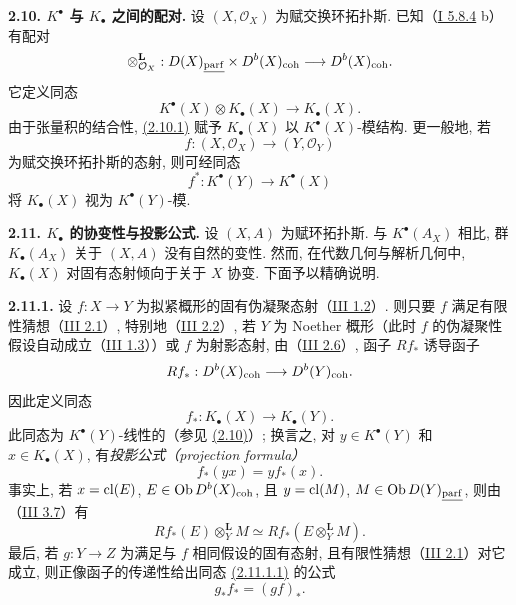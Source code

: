 \textbf{2.10. \(K^{\bullet}\) 与 \(K_{\bullet}\) 之间的配对.} 设 \((X,\mathcal O_X)\) 为赋交换环拓扑斯. 已知（\hyperlink{sga6.e01.rem.5-8-4}{I 5.8.4} b）有配对
\[
 \otimes_{\mathcal O_X}^{\mathbf L}:D(X)_{\underline{\operatorname{parf}}}\times D^b(X)_{\operatorname{coh}}
 \longrightarrow D^b(X)_{\operatorname{coh}}.
\]
它定义同态
\begin{equation}\tag{2.10.1}
 K^{\bullet}(X)\otimes K_{\bullet}(X)\longrightarrow K_{\bullet}(X).
\end{equation}
由于张量积的结合性, \hyperlink{sga6.e04.eq.2-10-1}{(2.10.1)} 赋予 \(K_{\bullet}(X)\) 以 \(K^{\bullet}(X)\)-模结构. 更一般地, 若
\[
 f:(X,\mathcal O_X)\longrightarrow (Y,\mathcal O_Y)
\]
为赋交换环拓扑斯的态射, 则可经同态
\[
 f^*:K^{\bullet}(Y)\longrightarrow K^{\bullet}(X)
\]
将 \(K_{\bullet}(X)\) 视为 \(K^{\bullet}(Y)\)-模.

\textbf{2.11. \(K_{\bullet}\) 的协变性与投影公式.} 设 \((X,A)\) 为赋环拓扑斯. 与 \(K^{\bullet}(A_X)\) 相比, 群 \(K_{\bullet}(A_X)\) 关于 \((X,A)\) 没有自然的变性. 然而, 在代数几何与解析几何中, \(K_{\bullet}(X)\) 对固有态射倾向于关于 \(X\) 协变. 下面予以精确说明.

\textbf{2.11.1.} 设 \(f:X\to Y\) 为拟紧概形的固有伪凝聚态射（\hyperlink{sga6.e03.def.1-2}{III 1.2}）. 则只要 \(f\) 满足有限性猜想（\hyperlink{sga6.e03.conj.2-1}{III 2.1}）, 特别地（\hyperlink{sga6.e03.thm.2-2}{III 2.2}）, 若 \(Y\) 为 Noether 概形（此时 \(f\) 的伪凝聚性假设自动成立（\hyperlink{sga6.e03.ex.1-3}{III 1.3}））或 \(f\) 为射影态射, 由（\hyperlink{sga6.e03.schol.2-6}{III 2.6}）, 函子 \(Rf_*\) 诱导函子
\[
 Rf_*:D^b(X)_{\operatorname{coh}}\longrightarrow D^b(Y)_{\operatorname{coh}}.
\]
因此定义同态
\begin{equation}\tag{2.11.1.1}
 f_*:K_{\bullet}(X)\longrightarrow K_{\bullet}(Y).
\end{equation}
此同态为 \(K^{\bullet}(Y)\)-线性的（参见 \hyperlink{sga6.e04.para.2-10}{(2.10)}）; 换言之, 对 \(y\in K^{\bullet}(Y)\) 和 \(x\in K_{\bullet}(X)\), 有\emph{投影公式（projection formula）}
\begin{equation}\tag{2.11.1.2}
 f_*(yx)=y f_*(x).
\end{equation}
事实上, 若 \(x=\operatorname{cl}(E)\), \(E\in\operatorname{Ob} D^b(X)_{\operatorname{coh}}\), 且 \(y=\operatorname{cl}(M)\), \(M\in\operatorname{Ob} D(Y)_{\underline{\operatorname{parf}}}\), 则由（\hyperlink{sga6.e03.prop.3-7}{III 3.7}）有
\[
 Rf_*(E)\otimes_Y^{\mathbf L}M\simeq
 Rf_*(E\otimes_Y^{\mathbf L}M).
\]
最后, 若 \(g:Y\to Z\) 为满足与 \(f\) 相同假设的固有态射, 且有限性猜想（\hyperlink{sga6.e03.conj.2-1}{III 2.1}）对它成立, 则正像函子的传递性给出同态 \hyperlink{sga6.e04.eq.2-11-1-1}{(2.11.1.1)} 的公式
\begin{equation}\tag{2.11.1.3}
 g_*f_*=(gf)_*.
\end{equation}

